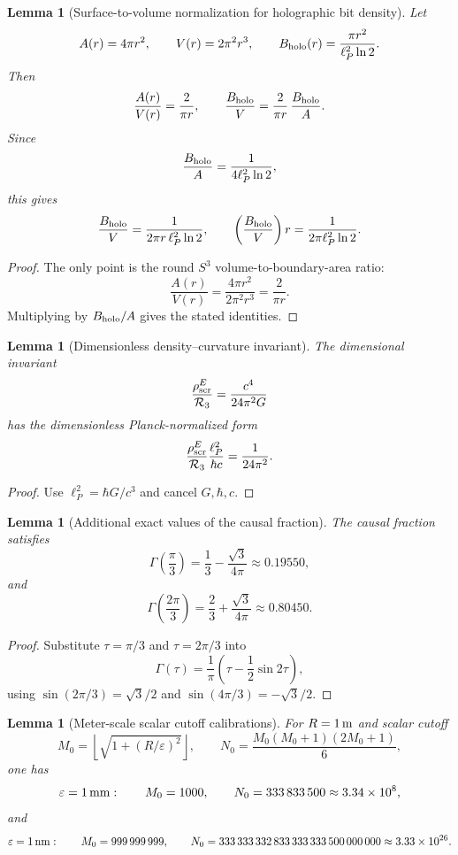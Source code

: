 \documentclass[11pt,a4paper]{article}
\newtheorem{lemma}[theorem]{Lemma}
\begin{document}
\begin{lemma}[Surface-to-volume normalization for holographic bit density]
Let
\[
A(r)=4\pi r^2,
\qquad
V(r)=2\pi^2r^3,
\qquad
B_{\rm holo}(r)=\frac{\pi r^2}{\ell_P^2\ln2}.
\]
Then
\[
\frac{A(r)}{V(r)}=\frac{2}{\pi r},
\qquad
\frac{B_{\rm holo}}{V}
=
\frac{2}{\pi r}\,
\frac{B_{\rm holo}}{A}.
\]
Since
\[
\frac{B_{\rm holo}}{A}
=
\frac{1}{4\ell_P^2\ln2},
\]
this gives
\[
\frac{B_{\rm holo}}{V}
=
\frac{1}{2\pi r\,\ell_P^2\ln2},
\qquad
\left(\frac{B_{\rm holo}}{V}\right)r
=
\frac{1}{2\pi\ell_P^2\ln2}.
\]
\end{lemma}
\begin{proof}
The only point is the round \(S^3\) volume-to-boundary-area ratio:
\[
\frac{A(r)}{V(r)}
=
\frac{4\pi r^2}{2\pi^2r^3}
=
\frac{2}{\pi r}.
\]
Multiplying by \(B_{\rm holo}/A\) gives the stated identities.
\end{proof}

\begin{lemma}[Dimensionless density--curvature invariant]
The dimensional invariant
\[
\frac{\rho_{\rm scr}^E}{\mathcal R_3}
=
\frac{c^4}{24\pi^2G}
\]
has the dimensionless Planck-normalized form
\[
\frac{\rho_{\rm scr}^E}{\mathcal R_3}
\frac{\ell_P^2}{\hbar c}
=
\frac{1}{24\pi^2}.
\]
\end{lemma}
\begin{proof}
Use \(\ell_P^2=\hbar G/c^3\) and cancel \(G,\hbar,c\).
\end{proof}

\begin{lemma}[Additional exact values of the causal fraction]
The causal fraction satisfies
\[
\Gamma\!\left(\frac{\pi}{3}\right)
=
\frac13-\frac{\sqrt3}{4\pi}
\approx0.19550,
\]
and
\[
\Gamma\!\left(\frac{2\pi}{3}\right)
=
\frac23+\frac{\sqrt3}{4\pi}
\approx0.80450.
\]
\end{lemma}
\begin{proof}
Substitute \(\tau=\pi/3\) and \(\tau=2\pi/3\) into
\[
\Gamma(\tau)=\frac{1}{\pi}\left(\tau-\frac12\sin2\tau\right),
\]
using \(\sin(2\pi/3)=\sqrt3/2\) and \(\sin(4\pi/3)=-\sqrt3/2\).
\end{proof}

\begin{lemma}[Meter-scale scalar cutoff calibrations]
For \(R=1\,{\rm m}\) and scalar cutoff
\[
M_0=\left\lfloor\sqrt{1+(R/\varepsilon)^2}\right\rfloor,
\qquad
N_0=\frac{M_0(M_0+1)(2M_0+1)}6,
\]
one has
\[
\varepsilon=1\,{\rm mm}:\qquad
M_0=1000,
\qquad
N_0=333\,833\,500
\approx3.34\times10^8,
\]
and
\[
\varepsilon=1\,{\rm nm}:\qquad
M_0=999\,999\,999,
\qquad
N_0=333\,333\,332\,833\,333\,333\,500\,000\,000
\approx3.33\times10^{26}.
\]
\end{lemma}
\end{document}
